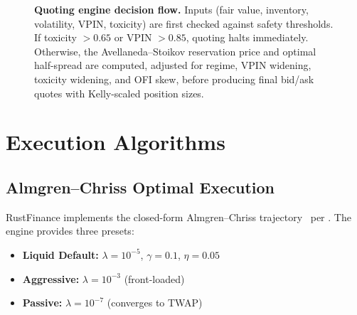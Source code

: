 \documentclass[11pt]{article}
\theoremstyle{definition}
\begin{document}
\begin{figure}[H]
\caption{\textbf{Quoting engine decision flow.} Inputs (fair value, inventory, volatility, VPIN, toxicity) are first checked against safety thresholds. If toxicity $> 0.65$ or VPIN $> 0.85$, quoting halts immediately. Otherwise, the Avellaneda--Stoikov reservation price and optimal half-spread are computed, adjusted for regime, VPIN widening, toxicity widening, and OFI skew, before producing final bid/ask quotes with Kelly-scaled position sizes.}
\label{fig:quoting-flow}
\end{figure}

\section{Execution Algorithms}
\label{sec:execution}

\subsection{Almgren--Chriss Optimal Execution}

RustFinance implements the closed-form Almgren--Chriss
trajectory~\cite{almgren2000} per .
The engine provides three presets:

\begin{itemize}[leftmargin=*,topsep=2pt,itemsep=1pt]
  \item \textbf{Liquid Default:} $\lambda = 10^{-5}$,
        $\gamma = 0.1$, $\eta = 0.05$
  \item \textbf{Aggressive:} $\lambda = 10^{-3}$ (front-loaded)
  \item \textbf{Passive:} $\lambda = 10^{-7}$ (converges to TWAP)
\end{itemize}
\end{document}
